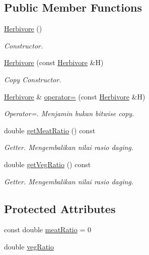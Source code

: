 \subsection*{Public Member Functions}
\begin{DoxyCompactItemize}
\item 
\hyperlink{classHerbivore_aeed0ccda0f35ecc74f56a7ea21aa5286}{Herbivore} ()
\begin{DoxyCompactList}\small\item\em Constructor. \end{DoxyCompactList}\item 
\hyperlink{classHerbivore_a8158d0b440b52ed984c444367ef7990d}{Herbivore} (const \hyperlink{classHerbivore}{Herbivore} \&H)
\begin{DoxyCompactList}\small\item\em Copy Constructor. \end{DoxyCompactList}\item 
\hyperlink{classHerbivore}{Herbivore} \& \hyperlink{classHerbivore_a8c5a037a616f3475696e6984f1a60545}{operator=} (const \hyperlink{classHerbivore}{Herbivore} \&H)
\begin{DoxyCompactList}\small\item\em Operator=. Menjamin bukan bitwise copy. \end{DoxyCompactList}\item 
double \hyperlink{classHerbivore_a4c381eb2420800585b927caf008c48d8}{get\+Meat\+Ratio} () const 
\begin{DoxyCompactList}\small\item\em Getter. Mengembalikan nilai rasio daging. \end{DoxyCompactList}\item 
double \hyperlink{classHerbivore_aed86c22a9551c7ad0aab5488e6db6c94}{get\+Veg\+Ratio} () const 
\begin{DoxyCompactList}\small\item\em Getter. Mengembalikan nilai rasio daging. \end{DoxyCompactList}\end{DoxyCompactItemize}
\subsection*{Protected Attributes}
\begin{DoxyCompactItemize}
\item 
const double \hyperlink{classHerbivore_afc971698b03df63c433e8e6300f43347}{meat\+Ratio} = 0
\item 
double \hyperlink{classHerbivore_a4d0aec1023006ba35707eb15b7092360}{veg\+Ratio}
\end{DoxyCompactItemize}


